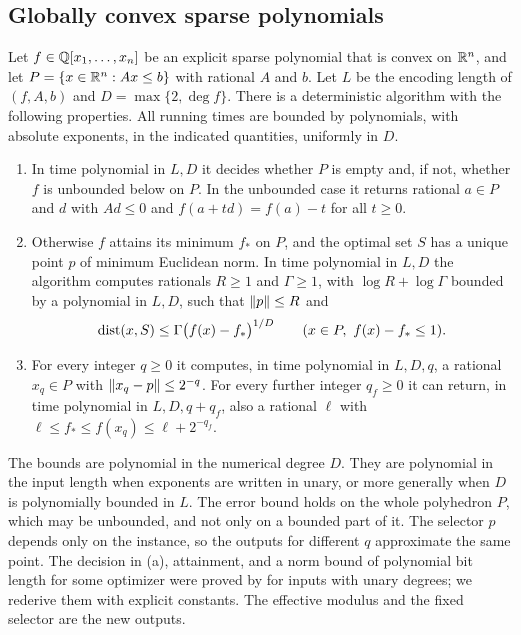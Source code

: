 \subsection{Globally convex sparse polynomials}\label{sec:points-global}

\begin{theorem}\label{thm:global-point}
Let $f\in\mathbb Q[x_1,\ldots,x_n]$ be an explicit sparse polynomial that is
convex on $\mathbb R^n$, and let $P=\{x\in\mathbb R^n:Ax\le b\}$ with rational $A$ and $b$.
Let $L$ be the encoding length of $(f,A,b)$ and $D=\max\{2,\deg f\}$. There
is a deterministic algorithm with the following properties. All running
times are bounded by polynomials, with absolute exponents, in the indicated
quantities, uniformly in $D$.
\begin{enumerate}[label=(\alph*)]
\item In time polynomial in $L,D$ it decides whether $P$ is empty and, if
not, whether $f$ is unbounded below on $P$. In the unbounded case it
returns rational $a\in P$ and $d$ with $Ad\le0$ and $f(a+td)=f(a)-t$ for all
$t\ge0$.
\item Otherwise $f$ attains its minimum $f_*$ on $P$, and the optimal set
$S$ has a unique point $p$ of minimum Euclidean norm. In time polynomial in
$L,D$ the algorithm computes rationals $R\ge1$ and $\Gamma\ge1$, with
$\log R+\log\Gamma$ bounded by a polynomial in $L,D$, such that
$\left\lVert p\right\rVert\le R$ and
\[
 \operatorname{dist}(x,S)\le\Gamma\bigl(f(x)-f_*\bigr)^{1/D}\qquad
 (x\in P,\ f(x)-f_*\le1).
\]
\item For every integer $q\ge0$ it computes, in time polynomial in
$L,D,q$, a rational $x_q\in P$ with $\left\lVert x_q-p\right\rVert\le2^{-q}$. For every further
integer $q_f\ge0$ it can return, in time polynomial in $L,D,q+q_f$, also a
rational $\ell$ with $\ell\le f_*\le f(x_q)\le\ell+2^{-q_f}$.
\end{enumerate}
\end{theorem}

The bounds are polynomial in the numerical degree $D$. They are polynomial
in the input length when exponents are written in unary, or more generally
when $D$ is polynomially bounded in $L$. The error bound holds on the whole
polyhedron $P$, which may be unbounded, and not only on a bounded part of it.
The selector $p$ depends only on the instance, so the outputs for
different $q$ approximate the same point. The decision in (a), attainment,
and a norm bound of polynomial bit length for some optimizer were proved by
\citet{SlotSteurerWiedmer2025} for inputs with unary degrees; we rederive
them with explicit constants. The effective modulus and the fixed selector
are the new outputs.

